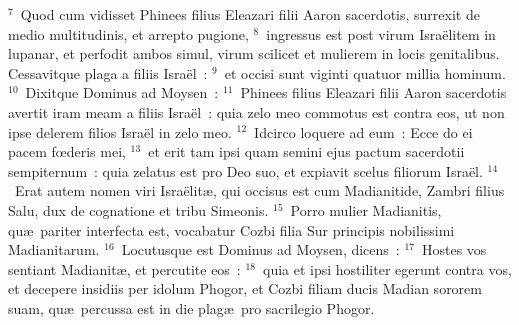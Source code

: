 ${}^{7}$~Quod cum vidisset Phinees filius Eleazari filii Aaron sacerdotis, surrexit de medio multitudinis, et arrepto pugione,
${}^{8}$~ingressus est post virum Isra\"elitem in lupanar, et perfodit ambos simul, virum scilicet et mulierem in locis genitalibus. Cessavitque plaga a filiis Isra\"el~:
${}^{9}$~et occisi sunt viginti quatuor millia hominum.
${}^{10}$~Dixitque Dominus ad Moysen~:
${}^{11}$~Phinees filius Eleazari filii Aaron sacerdotis avertit iram meam a filiis Isra\"el~: quia zelo meo commotus est contra eos, ut non ipse delerem filios Isra\"el in zelo meo.
${}^{12}$~Idcirco loquere ad eum~: Ecce do ei pacem fœderis mei,
${}^{13}$~et erit tam ipsi quam semini ejus pactum sacerdotii sempiternum~: quia zelatus est pro Deo suo, et expiavit scelus filiorum Isra\"el.
${}^{14}$~Erat autem nomen viri Isra\"elit\ae , qui occisus est cum Madianitide, Zambri filius Salu, dux de cognatione et tribu Simeonis.
${}^{15}$~Porro mulier Madianitis, qu\ae\ pariter interfecta est, vocabatur Cozbi filia Sur principis nobilissimi Madianitarum.
${}^{16}$~Locutusque est Dominus ad Moysen, dicens~:
${}^{17}$~Hostes vos sentiant Madianit\ae , et percutite eos~:
${}^{18}$~quia et ipsi hostiliter egerunt contra vos, et decepere insidiis per idolum Phogor, et Cozbi filiam ducis Madian sororem suam, qu\ae\ percussa est in die plag\ae\ pro sacrilegio Phogor.

